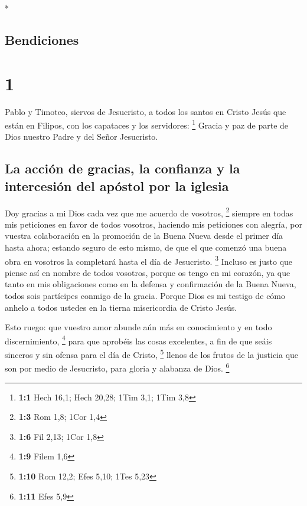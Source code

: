 \begin{paracol}{2} \switchcolumn[0]*

\hypertarget{bendiciones}{%
\subsection{Bendiciones}\label{bendiciones}}

\hypertarget{section}{%
\section{1}\label{section}}

 Pablo y Timoteo, siervos de Jesucristo, a todos los
santos en Cristo Jesús que están en Filipos, con los capataces y los
servidores: \footnote{\textbf{1:1} Hech 16,1; Hech 20,28; 1Tim 3,1; 1Tim
  3,8}  Gracia y paz de parte de Dios nuestro Padre y del
Señor Jesucristo.

\hypertarget{la-acciuxf3n-de-gracias-la-confianza-y-la-intercesiuxf3n-del-apuxf3stol-por-la-iglesia}{%
\subsection{La acción de gracias, la confianza y la intercesión del
apóstol por la
iglesia}\label{la-acciuxf3n-de-gracias-la-confianza-y-la-intercesiuxf3n-del-apuxf3stol-por-la-iglesia}}

 Doy gracias a mi Dios cada vez que me acuerdo de
vosotros, \footnote{\textbf{1:3} Rom 1,8; 1Cor 1,4} 
siempre en todas mis peticiones en favor de todos vosotros, haciendo mis
peticiones con alegría,  por vuestra colaboración en la
promoción de la Buena Nueva desde el primer día hasta ahora;
 estando seguro de esto mismo, de que el que comenzó una
buena obra en vosotros la completará hasta el día de Jesucristo.
\footnote{\textbf{1:6} Fil 2,13; 1Cor 1,8}  Incluso es
justo que piense así en nombre de todos vosotros, porque os tengo en mi
corazón, ya que tanto en mis obligaciones como en la defensa y
confirmación de la Buena Nueva, todos sois partícipes conmigo de la
gracia.  Porque Dios es mi testigo de cómo anhelo a todos
ustedes en la tierna misericordia de Cristo Jesús.

 Esto ruego: que vuestro amor abunde aún más en
conocimiento y en todo discernimiento, \footnote{\textbf{1:9} Filem 1,6}
 para que aprobéis las cosas excelentes, a fin de que
seáis sinceros y sin ofensa para el día de Cristo, \footnote{\textbf{1:10}
  Rom 12,2; Efes 5,10; 1Tes 5,23}  llenos de los frutos
de la justicia que son por medio de Jesucristo, para gloria y alabanza
de Dios. \footnote{\textbf{1:11} Efes 5,9}


\end{paracol}
